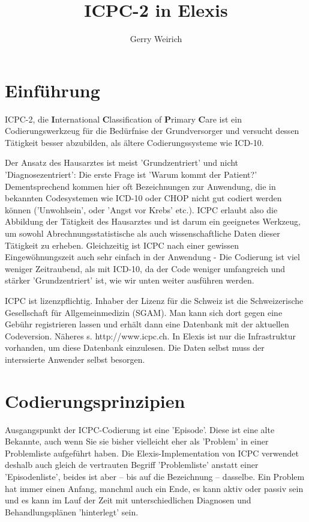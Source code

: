 \documentclass[a4paper]{scrartcl}
\begin{document}
\title{ICPC-2 in Elexis}
\author{Gerry Weirich}
\maketitle

\section{Einführung}
ICPC-2, die \textbf{I}nternational \textbf{C}lassification of \textbf{P}rimary \textbf{C}are ist ein Codierungswerkzeug für die Bedürfnise der Grundversorger und versucht dessen Tätigkeit besser abzubilden, als ältere Codierungssysteme wie ICD-10.

Der Ansatz des Hausarztes ist meist 'Grundzentriert' und nicht 'Diagnosezentriert': Die erste Frage ist 'Warum kommt der Patient?' Dementsprechend kommen hier oft Bezeichnungen zur Anwendung, die in bekannten Codesystemen wie ICD-10 oder CHOP nicht gut codiert werden können ('Unwohlsein', oder 'Angst vor Krebs' etc.). ICPC erlaubt also die Abbildung der Tätigkeit des Hausarztes und ist darum ein geeignetes Werkzeug, um sowohl Abrechnungsstatistische als auch wissenschaftliche Daten dieser Tätigkeit zu erheben. Gleichzeitig ist ICPC nach einer gewissen Eingewöhnungszeit auch sehr einfach in der Anwendung - Die Codierung ist viel weniger Zeitraubend, als mit ICD-10, da der Code weniger umfangreich und stärker 'Grundzentriert' ist, wie wir unten weiter ausführen werden.

\medskip
ICPC ist lizenzpflichtig. Inhaber der Lizenz für die Schweiz ist die Schweizerische Gesellschaft für Allgemeinmedizin (SGAM). Man kann sich dort gegen eine Gebühr registrieren lassen und erhält dann eine Datenbank mit der aktuellen Codeversion. Näheres s. http://www.icpc.ch. In Elexis ist nur die Infrastruktur vorhanden, um diese Datenbank einzulesen. Die Daten selbst muss der interssierte Anwender selbst besorgen.

\section{Codierungsprinzipien}
 Ausgangspunkt der ICPC-Codierung ist eine 'Episode'. Diese ist eine alte Bekannte, auch wenn Sie sie bisher vielleicht eher als 'Problem' in einer Problemliste aufgeführt haben. Die Elexis-Implementation von ICPC verwendet deshalb auch gleich de vertrauten Begriff 'Problemliste' anstatt einer 'Episodenliste', beides ist aber -- bis auf die Bezeichnung -- dasselbe. Ein Problem hat immer einen Anfang, manchml auch ein Ende, es kann aktiv oder passiv sein und es kann im Lauf der Zeit mit unterschiedlichen Diagnosen und Behandlungsplänen 'hinterlegt' sein. 
\end{document}
